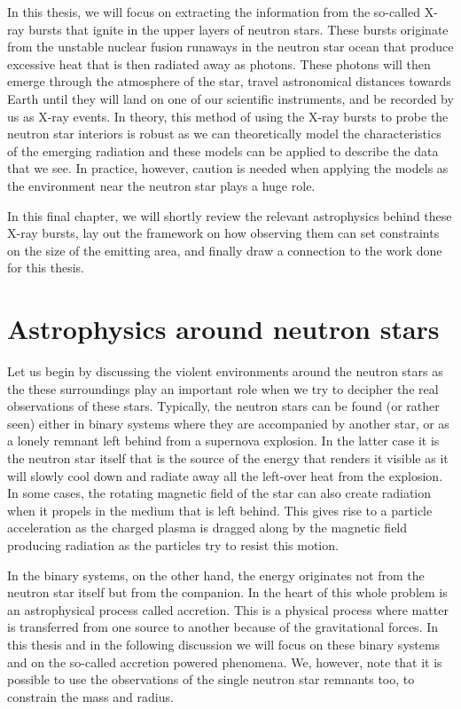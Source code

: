 In this thesis, we will focus on extracting the information from the so-called X-ray bursts that ignite in the upper layers of neutron stars.
These bursts originate from the unstable nuclear fusion runaways in the neutron star ocean that produce excessive heat that is then radiated away as photons.
These photons will then emerge through the atmosphere of the star, travel astronomical distances towards Earth until they will land on one of our scientific instruments, and be recorded by us as X-ray events.
In theory, this method of using the X-ray bursts to probe the neutron star interiors is robust as we can theoretically model the characteristics of the emerging radiation and these models can be applied to describe the data that we see. 
In practice, however, caution is needed when applying the models as the environment near the neutron star plays a huge role.

In this final chapter, we will shortly review the relevant astrophysics behind these X-ray bursts, lay out the framework on how observing them can set constraints on the size of the emitting area, and finally draw a connection to the work done for this thesis.


\section{Astrophysics around neutron stars}
Let us begin by discussing the violent environments around the neutron stars as the these surroundings play an important role when we try to decipher the real observations of these stars.
Typically, the neutron stars can be found (or rather seen) either in binary systems where they are accompanied by another star, or as a lonely remnant left behind from a supernova explosion.
In the latter case it is the neutron star itself that is the source of the energy that renders it visible as it will slowly cool down and radiate away all the left-over heat from the explosion.
In some cases, the rotating magnetic field of the star can also create radiation when it propels in the medium that is left behind.
This gives rise to a particle acceleration as the charged plasma is dragged along by the magnetic field producing radiation as the particles try to resist this motion.


In the binary systems, on the other hand, the energy originates not from the neutron star itself but from the companion.
In the heart of this whole problem is an astrophysical process called accretion.
This is a physical process where matter is transferred from one source to another because of the gravitational forces.
In this thesis and in the following discussion we will focus on these binary systems and on the so-called accretion powered phenomena.
We, however, note that it is possible to use the observations of the single neutron star remnants too, to constrain the mass and radius.\cite[see, e.g.,][]{PR06}


